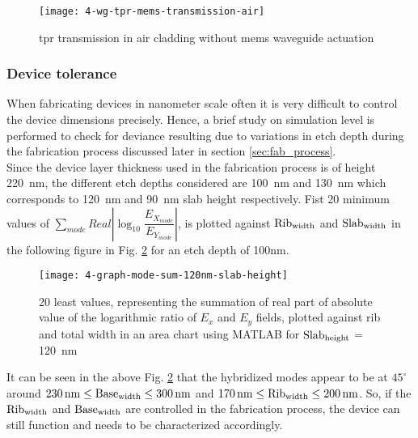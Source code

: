 \documentclass[../report.tex]{subfiles}
\begin{document}
\begin{figure}[H] %
	\centering
	\texttt{[image: 4-wg-tpr-mems-transmission-air]}
	\caption{\gls{tpr} transmission in air cladding without \gls{mems} waveguide actuation}
	\label{fig:4_wg_tpr_mems_transmission_air}
\end{figure}

\subsubsection{Device tolerance}
When fabricating devices in nanometer scale often it is very difficult to control the device dimensions precisely. Hence, a brief study on simulation level is performed to check for deviance resulting due to variations in etch depth during the fabrication process discussed later in section \ref{sec:fab_process}.\\  

Since the device layer thickness used in the fabrication process is of height \SI{220}{\nano \meter}, the different etch depths considered are \SI{100}{\nano \meter} and \SI{130}{\nano \meter} which corresponds to \SI{120}{\nano \meter} and \SI{90}{\nano \meter} slab height respectively. Fist 20 minimum values of $\sum _{mode}Real\left| \log _{10}\dfrac {E_{X_{mode}}} {E_{Y_{mode}}}\right|$, is plotted against $\mathrm{Rib_{width}}$ and $\mathrm{Slab_{width}}$ in the following figure in Fig. \ref{fig:4_graph_mode_sum_120nm_slab_height} for an etch depth of 100nm. 

\begin{figure}[H] %
	\centering
	\texttt{[image: 4-graph-mode-sum-120nm-slab-height]}
	\caption{20 least values, representing the summation of real part of absolute value of the logarithmic ratio of $E_x$ and $E_y$ fields, plotted against rib and total width in an area chart using MATLAB for $\mathrm{Slab_{height}}$ = \SI{120}{\nano \meter}}
	\label{fig:4_graph_mode_sum_120nm_slab_height}
\end{figure}
\noindent It can be seen in the above Fig. \ref{fig:4_graph_mode_sum_120nm_slab_height} that the hybridized modes appear to be at $45^{\circ}$ around $\mathrm{\SI{230}{\nano \meter} \leq Base_{width} \leq \SI{300}{\nano \meter}}$ and $\mathrm{\SI{170}{\nano \meter} \leq Rib_{width} \leq \SI{200}{\nano \meter}}$. So, if the $\mathrm{Rib_{width}}$ and $\mathrm{Base_{width}}$ are controlled in the fabrication process, the device can still function and needs to be characterized accordingly.\\
\end{document}
